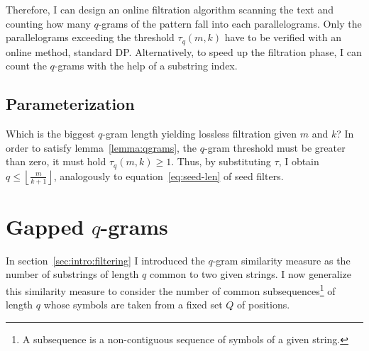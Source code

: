 Therefore, I can design an online filtration algorithm scanning the text and counting how many $q$-grams of the pattern fall into each parallelograms.
Only the parallelograms exceeding the threshold $\tau_q(m,k)$ have to be verified with an online method, \eg standard DP.
Alternatively, to speed up the filtration phase, I can count the $q$-grams with the help of a substring index.

\subsection{Parameterization}

Which is the biggest $q$-gram length yielding lossless filtration given $m$ and $k$?
In order to satisfy lemma~\ref{lemma:qgrams}, the $q$-gram threshold must be greater than zero, \ie it must hold $\tau_q(m,k) \geq 1$.
Thus, by substituting $\tau$, I obtain $q \leq \left \lfloor \frac{m}{k+1} \right \rfloor$, analogously to equation~\ref{eq:seed-len} of seed filters.


\section{Gapped $q$-grams}


In section~\ref{sec:intro:filtering} I introduced the $q$-gram similarity measure as the number of substrings of length $q$ common to two given strings.
I now generalize this similarity measure to consider the number of common subsequences\footnote{A subsequence is a non-contiguous sequence of symbols of a given string.} of length $q$ whose symbols are taken from a fixed set $Q$ of positions.

